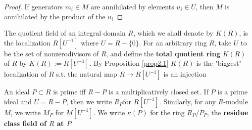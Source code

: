 \documentclass[11pt]{article}
\begin{document}
\begin{proof}
If generators \(m_i\in M\) are annihilated by elements \(u_i\in U\), then
\(M\) is annihilated by the product of the \(u_i\)
\end{proof}

The quotient field of an integral domain \(R\), which we shall denote by
\(K(R)\), is the localization \(R[U^{-1}]\) where \(U=R-\{0\}\). For an
arbitrary ring \(R\), take \(U\) to be the set of nonzerodivisors of \(R\),
and define the \textbf{total quotient ring} \(K(R)\) of \(R\) by \(K(R):=R[U^{-1}]\).
By Proposition \ref{prop2.1} \(K(R)\) is the "biggest" localization of \(R\) s.t.
the natural map \(R\to R[U^{-1}]\) is an injection

An ideal \(P\subset R\) is prime iff \(R-P\) is a multiplicatively closed
set. If \(P\) is a prime ideal and \(U=R-P\), then we write \(R_P\)for
\(R[U^{-1}]\). Similarly, for any \(R\)-module \(M\), we write \(M_P\) for
\(M[U^{-1}]\). We write \(\kappa(P)\) for the ring \(R_P/P_P\), the
\textbf{residue class field  of \(R\) at \(P\)}.
\end{document}
